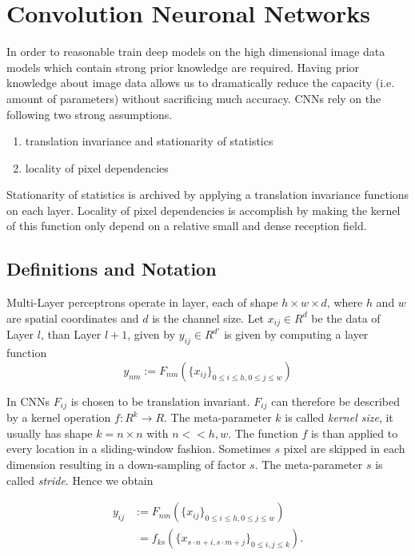 \section{Convolution Neuronal Networks}\label{sec:cnn}

In order to reasonable train deep models on the high dimensional image data models which contain strong prior knowledge are required. Having prior knowledge about image data allows us to dramatically reduce the capacity (i.e. amount of parameters) without sacrificing much accuracy. CNNs rely on the following two strong assumptions.

\begin{enumerate}
    \item translation invariance and stationarity of statistics
	\item locality of pixel dependencies
\end{enumerate}

Stationarity of statistics is archived by applying a translation invariance functions on each layer. Locality of pixel dependencies is accomplish by making the kernel of this function only depend on a relative small and dense reception field. 

\subsection{Definitions and Notation}

Multi-Layer perceptrons operate in layer, each of shape $h \times w \times d$, where $h$ and $w$ are spatial coordinates and $d$ is the channel size. Let $x_{ij} \in R^d$ be the data of Layer $l$, than Layer $l+1$, given by $y_{ij} \in R^{d'}$ is given by computing a layer function 
\begin{equation*}
y_{nm} := F_{nm} (\{ x_{ij} \}_{0 \leq i \leq h, 0 \leq j \leq w}   )
\end{equation*}

In CNNs $F_{ij}$ is chosen to be translation invariant. $F_{ij}$ can therefore be described by a kernel  operation $f: R^k \rightarrow R$. The meta-parameter $k$ is called \emph{kernel size}, it usually has shape $k = n \times n$ with $n << h,w$.  The function $f$ is than applied to every location in a sliding-window fashion. Sometimes $s$ pixel are skipped in each dimension resulting in a down-sampling of factor $s$. The meta-parameter $s$ is called \emph{stride}. Hence we obtain

\begin{align*}
y_{ij} &:= F_{nm} (\{ x_{ij} \}_{0 \leq i \leq h, 0 \leq j \leq w}   ) \\&\; = f_{ks} (\{x_{s \cdot n + i, s \cdot m + j}  \}_{0 \leq i,j \leq k} ).
\end{align*}

